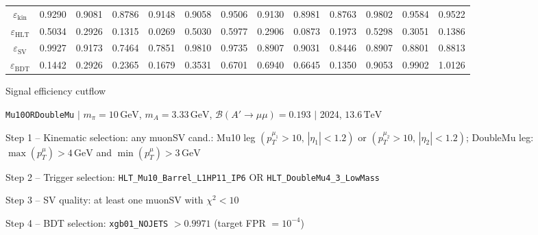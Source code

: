 \documentclass[10pt,a4paper]{article}
\begin{document}
\begin{landscape}
{\begin{tabular}{c|cccc|cccc|cccc}
\midrule
$\varepsilon_{\mathrm{kin}}$ & 0.9290 & 0.9081 & 0.8786 & 0.9148 & 0.9058 & 0.9506 & 0.9130 & 0.8981 & 0.8763 & 0.9802 & 0.9584 & 0.9522\\
$\varepsilon_{\mathrm{HLT}}$ & 0.5034 & 0.2926 & 0.1315 & 0.0269 & 0.5030 & 0.5977 & 0.2906 & 0.0873 & 0.1973 & 0.5298 & 0.3051 & 0.1386\\
$\varepsilon_{\mathrm{SV}}$ & 0.9927 & 0.9173 & 0.7464 & 0.7851 & 0.9810 & 0.9735 & 0.8907 & 0.9031 & 0.8446 & 0.8907 & 0.8801 & 0.8813\\
$\varepsilon_{\mathrm{BDT}}$ & 0.1442 & 0.2926 & 0.2365 & 0.1679 & 0.3531 & 0.6701 & 0.6940 & 0.6645 & 0.1350 & 0.9053 & 0.9902 & 1.0126\\
\bottomrule
\end{tabular}}

\end{landscape}
\clearpage

{\large Signal efficiency cutflow

 \texttt{Mu10ORDoubleMu} $|$ $m_{\pi}=10\,\mathrm{GeV}$, $m_{A}=3.33\,\mathrm{GeV}$, $\mathcal{B}(A'\!\to\!\mu\mu)=0.193$ $|$ 2024, $13.6\,\mathrm{TeV}$}

\vspace{0.8em}

Step 1 -- Kinematic selection: any muonSV cand.: Mu10 leg $(p_T^{\mu_1}{>}10,\,|\eta_1|{<}1.2)$ or $(p_T^{\mu_2}{>}10,\,|\eta_2|{<}1.2)$; DoubleMu leg: $\max(p_T^{\mu}){>}4\,\mathrm{GeV}$ and $\min(p_T^{\mu}){>}3\,\mathrm{GeV}$

Step 2 -- Trigger selection: \texttt{HLT\_Mu10\_Barrel\_L1HP11\_IP6} OR \texttt{HLT\_DoubleMu4\_3\_LowMass}

Step 3 -- SV quality: at least one muonSV with $\chi^2<10$

Step 4 -- BDT selection: \texttt{xgb01\_NOJETS} $>0.9971$ (target FPR $=10^{-4}$)

\vspace{0.8em}
\end{document}
